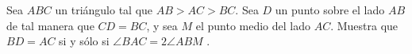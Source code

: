 \begin{problem}
    
    Sea $ABC$ un triángulo tal que $AB > AC > BC$. Sea $D$ un punto sobre el lado $AB$ de tal
manera que $CD = BC$, y sea $M$ el punto medio del lado $AC$. Muestra que $BD = AC$ si
y sólo si $\angle BAC = 2\angle ABM$ .
    
    \label{07MEX6}
\end{problem}
